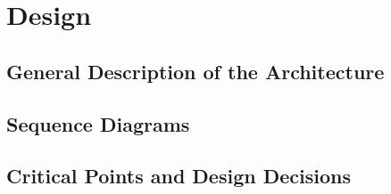 \documentclass[a4paper,12pt]{article}
\begin{document}
\newpage

\section{Design}
\subsection{General Description of the Architecture}

\subsection{Sequence Diagrams}



\subsection{Critical Points and Design Decisions}
\end{document}
